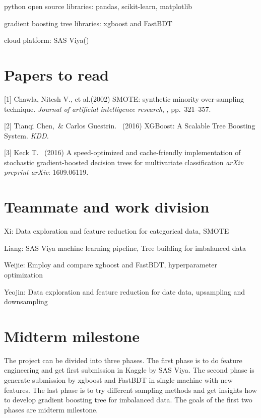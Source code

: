 \documentclass{article}
\begin{document}
python open source libraries: pandas, scikit-learn, matplotlib

gradient boosting tree libraries: xgboost and FastBDT

cloud platform: SAS Viya()

\section{Papers to read}

[1] Chawla, Nitesh V., et al.(2002) SMOTE: synthetic minority over-sampling technique. {\it Journal of artificial intelligence research}, , pp.\ 321--357.

[2] Tianqi Chen,\ \& Carlos Guestrin. \ (2016) XGBoost: A Scalable Tree Boosting System. {\it KDD.}

[3] Keck T. \ (2016) A speed-optimized and cache-friendly implementation of stochastic gradient-boosted decision trees for multivariate classification {\it arXiv preprint arXiv}: 1609.06119.



\section{Teammate and work division}
Xi: Data exploration and feature reduction for categorical data, SMOTE

Liang: SAS Viya machine learning pipeline, Tree building for imbalanced data

Weijie: Employ and compare xgboost and FastBDT, hyperparameter optimization

Yeojin: Data exploration and feature reduction for date data, upsampling and downsampling

\section{Midterm milestone}
The project can be divided into three phases. The first phase is to do feature engineering and get first submission in Kaggle by SAS Viya. The second phase is generate submission by xgboost and FastBDT in single machine with new features. The last phase is to try different sampling methods and get insights how to develop gradient boosting tree for imbalanced data. The goals of the first two phases are midterm milestone.
\end{document}
